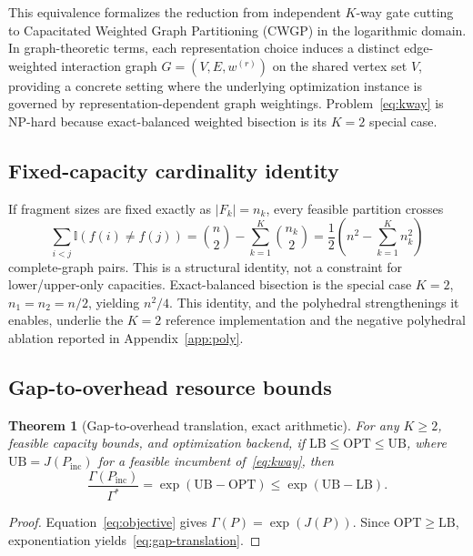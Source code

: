 \documentclass[
  aps,
  pra,
  reprint,
  amsmath,
  amssymb,
  longbibliography,
  nofootinbib,
  floatfix
]{revtex4-2}
\theoremstyle{plain}
\newtheorem{theorem}{Theorem}
\newcommand{\OPT}{\mathrm{OPT}}
\newcommand{\LB}{\mathrm{LB}}
\newcommand{\UB}{\mathrm{UB}}
\begin{document}
This equivalence formalizes the reduction from independent $K$-way gate cutting to Capacitated Weighted Graph Partitioning (CWGP) in the logarithmic domain. In graph-theoretic terms, each representation choice induces a distinct edge-weighted interaction graph $G=(V, E, w^{(r)})$ on the shared vertex set $V$, providing a concrete setting where the underlying optimization instance is governed by representation-dependent graph weightings. Problem~\eqref{eq:kway} is NP-hard because exact-balanced weighted bisection is its $K=2$ special case.

\subsection{Fixed-capacity cardinality identity}

If fragment sizes are fixed exactly as $|F_k|=n_k$, every feasible partition crosses
\begin{equation}
  \sum_{i<j}\mathbb{I}(f(i)\neq f(j))
  = \binom{n}{2}-\sum_{k=1}^{K}\binom{n_k}{2}
  = \frac12\left(n^2-\sum_{k=1}^{K}n_k^2\right)
  \label{eq:kway-cardinality}
\end{equation}
complete-graph pairs. This is a structural identity, not a constraint for lower/upper-only capacities. Exact-balanced bisection is the special case $K=2$, $n_1=n_2=n/2$, yielding $n^2/4$. This identity, and the polyhedral strengthenings it enables, underlie the $K=2$ reference implementation and the negative polyhedral ablation reported in Appendix~\ref{app:poly}.

\subsection{Gap-to-overhead resource bounds}

\begin{theorem}[Gap-to-overhead translation, exact arithmetic]\label{thm:gap}
For any $K\geq2$, feasible capacity bounds, and optimization backend, if $\LB\leq\OPT\leq\UB$, where $\UB=J(P_{\mathrm{inc}})$ for a feasible incumbent of~\eqref{eq:kway}, then
\begin{equation}
  \frac{\Gamma(P_{\mathrm{inc}})}{\Gamma^*}
  = \exp(\UB-\OPT) \leq \exp(\UB-\LB).
  \label{eq:gap-translation}
\end{equation}
\end{theorem}
\begin{proof}
Equation~\eqref{eq:objective} gives $\Gamma(P)=\exp(J(P))$. Since $\OPT\geq\LB$, exponentiation yields~\eqref{eq:gap-translation}.
\end{proof}
\end{document}
